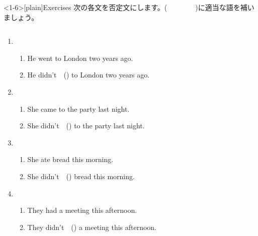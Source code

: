 \documentclass[aspectratio=169,xcolor={dvipsnames,table}]{beamer}
\newcommand{\myaudio}[1]{\href{#1}{\faVolumeUp}}
\begin{document}
\begin{frame}<1-6>[plain]{Exercises}
 次の各文を否定文にします。(~~~~~~~~)に適当な語を補いましょう。

\begin{columns}
\begin{column}{.6\textwidth}
\begin{enumerate}
 \item \begin{enumerate}
	\item He went to London two years ago.
	\item He didn't~~() to London two years ago.
       \end{enumerate}
 \item \begin{enumerate}
	\item She came to the party last night.
	\item She didn't~~() to the party last night.
       \end{enumerate}
 \item \begin{enumerate}
	\item She ate bread this morning.
	\item She didn't~~() bread this morning.
       \end{enumerate}
 \item \begin{enumerate}
	\item They had a meeting this afternoon.
	\item They didn't~~() a meeting this afternoon.
       \end{enumerate}
\end{enumerate}
\end{column}
\begin{column}{.35\textwidth}
%
\end{column}
\end{columns}
\hfill\myaudio{./audio/026_past_didnot_06.mp3}

\end{frame}
\end{document}
